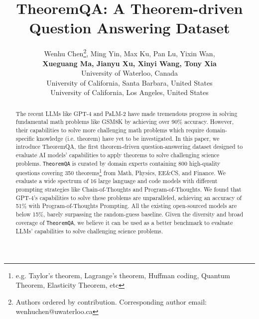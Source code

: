 \documentclass[11pt]{article}
\title{TheoremQA: A Theorem-driven Question Answering Dataset}
\author{Wenhu Chen\thanks{\quad Authors ordered by contribution. Corresponding author email: wenhuchen@uwaterloo.ca}, Ming Yin, Max Ku, Pan Lu, Yixin Wan, \\
\textbf{Xueguang Ma, Jianyu Xu, Xinyi Wang, Tony Xia}\\
University of Waterloo, Canada \\
University of California, Santa Barbara, United States \\
University of California, Los Angeles, United States \\}
\newcommand{\dataset}{\texttt{TheoremQA}\xspace}
\begin{document}
\maketitle
\begin{abstract}
The recent LLMs like GPT-4 and PaLM-2 have made tremendous progress in solving fundamental math problems like GSM8K by achieving over 90\% accuracy. However, their capabilities to solve more challenging math problems which require domain-specific knowledge (i.e. theorem) have yet to be investigated. In this paper, we introduce TheoremQA, the first theorem-driven question-answering dataset designed to evaluate AI models' capabilities to apply theorems to solve challenging science problems. \dataset is curated by domain experts containing 800 high-quality questions covering 350 theorems\footnote{e.g. Taylor's theorem, Lagrange's theorem, Huffman coding, Quantum Theorem, Elasticity Theorem, etc} from Math, Physics, EE\&CS, and Finance. We evaluate a wide spectrum of 16 large language and code models with different prompting strategies like Chain-of-Thoughts and Program-of-Thoughts. We found that GPT-4's capabilities to solve these problems are unparalleled, achieving an accuracy of 51\% with Program-of-Thoughts Prompting. All the existing open-sourced models are below 15\%, barely surpassing the random-guess baseline. Given the diversity and broad coverage of \dataset, we believe it can be used as a better benchmark to evaluate LLMs' capabilities to solve challenging science problems. 
\end{abstract}
\end{document}
